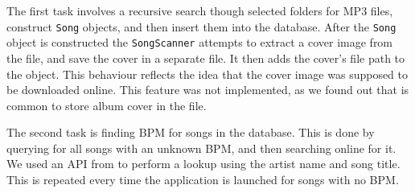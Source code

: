 The first task involves a recursive search though selected folders for MP3 files, construct \texttt{Song} objects, and then insert them into the database. After the \texttt{Song} object is constructed the \texttt{SongScanner} attempts to extract a cover image from the file, and save the cover in a separate file. It then adds the cover's file path to the object. This behaviour reflects the idea that the cover image was supposed to be downloaded online. This feature was not implemented, as we found out that is common to store album cover in the file.

The second task is finding BPM for songs in the database. This is done by querying for all songs with an unknown BPM, and then searching online for it. We used an API from \citet{echonest:API} to perform a lookup using the artist name and song title. This is repeated every time the application is launched for songs with no BPM.